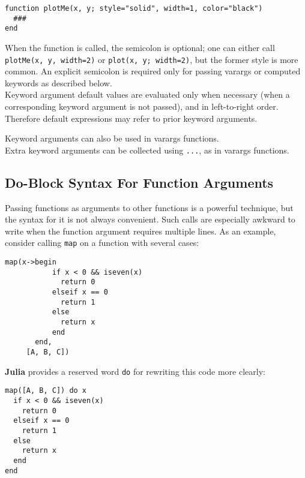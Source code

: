 \documentclass[
]{article}
\begin{document}
\begin{verbatim}
function plotMe(x, y; style="solid", width=1, color="black")
  ###
end
\end{verbatim}

When the function is called, the semicolon is optional; one can either
call \texttt{plotMe(x,\ y,\ width=2)} or \texttt{plot(x,\ y;\ width=2)},
but the former style is more common. An explicit semicolon is required
only for passing varargs or computed keywords as described below.\\
Keyword argument default values are evaluated only when necessary (when
a corresponding keyword argument is not passed), and in left-to-right
order. Therefore default expressions may refer to prior keyword
arguments.

Keyword arguments can also be used in varargs functions.\\
Extra keyword arguments can be collected using \texttt{...}, as in
varargs functions.

\hypertarget{do-block-syntax-for-function-arguments}{%
\subsection{Do-Block Syntax For Function
Arguments}\label{do-block-syntax-for-function-arguments}}

Passing functions as arguments to other functions is a powerful
technique, but the syntax for it is not always convenient. Such calls
are especially awkward to write when the function argument requires
multiple lines. As an example, consider calling \texttt{map} on a
function with several cases:

\begin{verbatim}
map(x->begin
           if x < 0 && iseven(x)
             return 0
           elseif x == 0
             return 1
           else
             return x
           end
       end,
     [A, B, C])
\end{verbatim}

\textbf{Julia} provides a reserved word \texttt{do} for rewriting this
code more clearly:

\begin{verbatim}
map([A, B, C]) do x
  if x < 0 && iseven(x)
    return 0
  elseif x == 0
    return 1
  else
    return x
  end
end
\end{verbatim}
\end{document}

